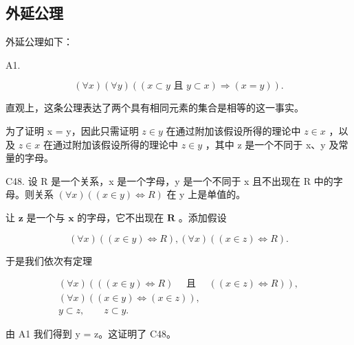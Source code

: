\subsection{外延公理}

外延公理如下：

A1.

\[
(\forall x) (\forall y) ((x \subset y \text {   且   } y \subset x) \Longrightarrow (x = y)).
\]

直观上，这条公理表达了两个具有相同元素的集合是相等的这一事实。

为了证明 x = y，因此只需证明 \(z \in y\) 在通过附加该假设所得的理论中 \(z \in x\) ，以及 \(z \in x\) 在通过附加该假设所得的理论中 \(z \in y\) ，其中 z 是一个不同于 x、y 及常量的字母。

C48. 设 R 是一个关系，x 是一个字母，y 是一个不同于 x 且不出现在 R 中的字母。则关系 \((\forall x)((x \in y) \Longleftrightarrow R)\) 在 y 上是单值的。

让 \(\pmb{z}\) 是一个与 \(\pmb{x}\) 的字母，它不出现在 \(\pmb{R}\) 。添加假设

\[
(\forall x) ((x \in y) \Longleftrightarrow R), (\forall x) ((x \in z) \Longleftrightarrow R).
\]

于是我们依次有定理

\[
\begin{array}{c} (\forall x) (((x \in y) \Longleftrightarrow R) \quad \text { 且 } \quad ((x \in z) \Longleftrightarrow R)), \\ (\forall x) ((x \in y) \Longleftrightarrow (x \in z)), \\ y \subset z, \qquad z \subset y. \end{array}
\]

由 A1 我们得到 y = z。这证明了 C48。

